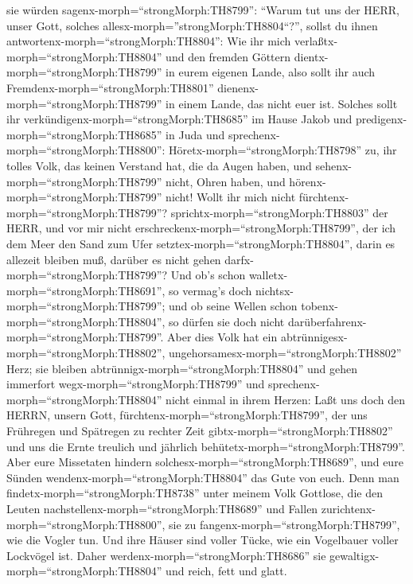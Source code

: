 sie würden sagenx-morph=``strongMorph:TH8799'': ``Warum tut uns der
HERR, unser Gott, solches allesx-morph=''strongMorph:TH8804``?'', sollst
du ihnen antwortenx-morph=``strongMorph:TH8804'': Wie ihr mich
verlaßtx-morph=``strongMorph:TH8804'' und den fremden Göttern
dientx-morph=``strongMorph:TH8799'' in eurem eigenen Lande, also sollt
ihr auch Fremdenx-morph=``strongMorph:TH8801''
dienenx-morph=``strongMorph:TH8799'' in einem Lande, das nicht euer ist.
 Solches sollt ihr
verkündigenx-morph=``strongMorph:TH8685'' im Hause Jakob und
predigenx-morph=``strongMorph:TH8685'' in Juda und
sprechenx-morph=``strongMorph:TH8800'': 
Höretx-morph=``strongMorph:TH8798'' zu, ihr tolles Volk, das keinen
Verstand hat, die da Augen haben, und
sehenx-morph=``strongMorph:TH8799'' nicht, Ohren haben, und
hörenx-morph=``strongMorph:TH8799'' nicht!  Wollt ihr mich
nicht fürchtenx-morph=``strongMorph:TH8799''?
sprichtx-morph=``strongMorph:TH8803'' der HERR, und vor mir nicht
erschreckenx-morph=``strongMorph:TH8799'', der ich dem Meer den Sand zum
Ufer setztex-morph=``strongMorph:TH8804'', darin es allezeit bleiben
muß, darüber es nicht gehen darfx-morph=``strongMorph:TH8799''? Und ob's
schon walletx-morph=``strongMorph:TH8691'', so vermag's doch
nichtsx-morph=``strongMorph:TH8799''; und ob seine Wellen schon
tobenx-morph=``strongMorph:TH8804'', so dürfen sie doch nicht
darüberfahrenx-morph=``strongMorph:TH8799''.  Aber dies
Volk hat ein abtrünnigesx-morph=``strongMorph:TH8802'',
ungehorsamesx-morph=``strongMorph:TH8802'' Herz; sie bleiben
abtrünnigx-morph=``strongMorph:TH8804'' und gehen immerfort
wegx-morph=``strongMorph:TH8799''  und
sprechenx-morph=``strongMorph:TH8804'' nicht einmal in ihrem Herzen:
Laßt uns doch den HERRN, unsern Gott,
fürchtenx-morph=``strongMorph:TH8799'', der uns Frühregen und Spätregen
zu rechter Zeit gibtx-morph=``strongMorph:TH8802'' und uns die Ernte
treulich und jährlich behütetx-morph=``strongMorph:TH8799''.
 Aber eure Missetaten hindern
solchesx-morph=``strongMorph:TH8689'', und eure Sünden
wendenx-morph=``strongMorph:TH8804'' das Gute von euch. 
Denn man findetx-morph=``strongMorph:TH8738'' unter meinem Volk
Gottlose, die den Leuten nachstellenx-morph=``strongMorph:TH8689'' und
Fallen zurichtenx-morph=``strongMorph:TH8800'', sie zu
fangenx-morph=``strongMorph:TH8799'', wie die Vogler tun. 
Und ihre Häuser sind voller Tücke, wie ein Vogelbauer voller Lockvögel
ist. Daher werdenx-morph=``strongMorph:TH8686'' sie
gewaltigx-morph=``strongMorph:TH8804'' und reich, fett und glatt.
